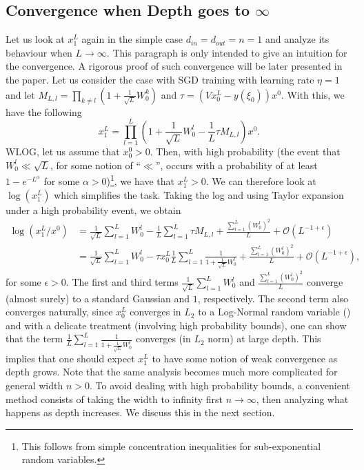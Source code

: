 \documentclass{article}
\theoremstyle{plain}
\theoremstyle{definition}
\begin{document}
\subsection{Convergence when Depth goes to $\infty$}
Let us look at $x^L_1$ again in the simple case $d_{in} = d_{out} = n = 1$ and analyze its behaviour when $L \to \infty$. This paragraph is only intended to give an intuition for the convergence. A rigorous proof of such convergence will be later presented in the paper. Let us consider the case with SGD training with learning rate $\eta = 1$ and let $M_{L,l}=\prod_{k \neq l} \left(1 + \frac{1}{\sqrt{L}} W_0^k\right)$ and $\tau = (V x^L_0 - y(\xi_0))x^0$. With this, we have the following 
\begin{equation}
x^L_1 = \prod_{l=1}^L \left( 1 + \frac{1}{\sqrt{L}} W^l_0 - \frac{1}{L} \tau M_{L,l}   \right) x^0.
\end{equation}
WLOG, let us assume that $x^0_0 > 0$. Then, with high probability (the event that $W^l_0 \ll \sqrt{L}$, for some notion of ``$\ll$'', occurs with a probability of at least $1 - e^{-L^{\alpha}}$ for some $\alpha>0$)\footnote{This follows from simple concentration inequalities for sub-exponential random variables.}, we have that $x^L_1 > 0$. We can therefore look at $\log(x^L_1)$ which simplifies the task. Taking the log and using Taylor expansion under a high probability event, we obtain
\begin{equation*}
\begin{aligned}
\log(x^L_1 / x^0) &= \frac{1}{\sqrt{L}} \sum_{l=1}^L W^l_0 - \frac{1}{L} \sum_{l=1}^L \tau M_{L,l}  + \frac{\sum_{l=1}^L (W^l_0)^2}{L} + \mathcal{O}(L^{-1+\epsilon})\\
&= \frac{1}{\sqrt{L}} \sum_{l=1}^L W^l_0 -  \tau x^L_0  \frac{1}{L} \sum_{l=1}^L \frac{1}{1 + \frac{1}{\sqrt{L}}W^l_0}  + \frac{\sum_{l=1}^L (W^l_0)^2}{L} + \mathcal{O}(L^{-1+\epsilon}),
\end{aligned}
\end{equation*}
for some $\epsilon > 0$. The first and third terms $\frac{1}{\sqrt{L}} \sum_{l=1}^L W^l_0 $ and $\frac{\sum_{l=1}^L (W^l_0)^2}{L}$ converge (almost surely) to a standard Gaussian and $1$, respectively. The second term also converges naturally, since $x^L_0$ converges in $L_2$ to a Log-Normal random variable (\cite{hayou2023infinitedepth}) and with a delicate treatment (involving high probability bounds), one can show that the term $\frac{1}{L} \sum_{l=1}^L \frac{1}{1 + \frac{1}{\sqrt{L}}W^l_0}$ converges (in $L_2$ norm) at large depth. This implies that one should expect $x^L_1$ to have some notion of weak convergence as depth grows. Note that the same analysis becomes much more complicated for general width $n > 0$. To avoid dealing with high probability bounds, a convenient method consists of taking the width to infinity first $n \to \infty$, then analyzing what happens as depth increases. We discuss this in the next section.
\end{document}
